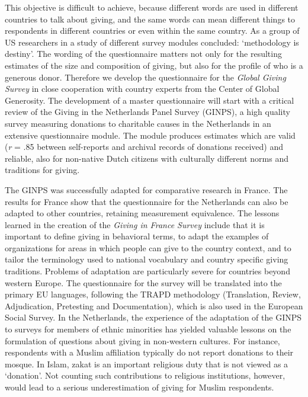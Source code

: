 \documentclass[twocolumn, serif, rga, numeric]{jote-article}
\begin{document}
This objective is difficult to achieve, because different words are used in different countries to talk about giving, and the same words can mean different things to respondents in different countries or even within the same country. As a group of US researchers in a study of different survey modules concluded: `methodology is destiny'.\cite{Rooney2004} The wording of the questionnaire matters not only for the resulting estimates of the size and composition of giving\cite{Rooney2004}, but also for the profile of who is a generous donor.\cite{Bekkers2016, Bekkers20162} Therefore we develop the questionnaire for the \emph{Global Giving Survey} in close cooperation with country experts from the Center of Global Generosity.
The development of a master questionnaire will start with a critical review of the Giving in the Netherlands Panel Survey (GINPS), a high quality survey measuring donations to charitable causes in the Netherlands in an extensive questionnaire module.\cite{Bekkers2011d, 99} The module produces estimates which are valid (\emph{r} = .85 between self-reports and archival records of donations received)\cite{Bekkers2011d} and reliable\cite{Bekkers2012}, also for non-native Dutch citizens with culturally different norms and traditions for giving.\cite{152}

The GINPS was successfully adapted for comparative research in France.\cite{Wiepking2009} The results for France show that the questionnaire for the Netherlands can also be adapted to other countries, retaining measurement equivalence. The lessons learned in the creation of the \emph{Giving in France Survey} include that it is important to define giving in behavioral terms, to adapt the examples of organizations for areas in which people can give to the country context, and to tailor the terminology used to national vocabulary and country specific giving traditions. Problems of adaptation are particularly severe for countries beyond western Europe. The questionnaire for the survey will be translated into the primary EU languages, following the TRAPD methodology (Translation, Review, Adjudication, Pretesting and Documentation)\cite{Harkness2008}, which is also used in the European Social Survey. In the Netherlands, the experience of the adaptation of the GINPS to surveys for members of ethnic minorities has yielded valuable lessons on the formulation of questions about giving in non-western cultures.\cite{152} For instance, respondents with a Muslim affiliation typically do not report donations to their mosque. In Islam, zakat is an important religious duty that is not viewed as a `donation'. Not counting such contributions to religious institutions, however, would lead to a serious underestimation of giving for Muslim respondents.
\end{document}

